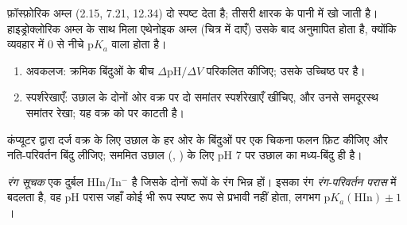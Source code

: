 फ़ॉस्फ़ोरिक अम्ल (2.15, 7.21, 12.34) दो स्पष्ट  देता है; तीसरी
क्षारक के पानी में खो जाती है। हाइड्रोक्लोरिक अम्ल के साथ मिला एथेनोइक अम्ल
(चित्र में दाएँ) उसके बाद अनुमापित होता है, क्योंकि  व्यवहार में 0 से नीचे $\mathrm{p}K_a$ वाला होता है।

\begin{method}[वक्र पर तुल्यता खोजना]\label{met:b1:titration-methods:derivative}
\begin{enumerate}
  \item अवकलज: क्रमिक बिंदुओं के बीच $\Delta\mathrm{pH}/\Delta V$ परिकलित
        कीजिए;  उसके उच्चिष्ठ पर है।
  \item स्पर्शरेखाएँ: उछाल के दोनों ओर वक्र पर दो समांतर स्पर्शरेखाएँ
        खींचिए, और उनसे समदूरस्थ समांतर रेखा; यह
        वक्र को  पर काटती है।
\end{enumerate}
\end{method}

\begin{method}[स्पर्शरेखाएँ, परिकलन द्वारा]\label{met:b1:titration-methods:tangents}
कंप्यूटर द्वारा दर्ज वक्र के लिए उछाल के हर ओर के बिंदुओं पर
एक चिकना फलन फ़िट कीजिए और नति-परिवर्तन बिंदु लीजिए; सममित
उछाल (, ) के लिए pH 7 पर उछाल का
मध्य-बिंदु ही  है।
\end{method}

\begin{definition}[रंग सूचक, रंग-परिवर्तन परास]\label{def:b1:titration-methods:indicator}
\emph{रंग सूचक} एक दुर्बल  HIn/In$^-$ है जिसके दोनों रूपों के रंग भिन्न हों। इसका रंग
\emph{रंग-परिवर्तन परास} में बदलता है, वह pH परास जहाँ
कोई भी रूप स्पष्ट रूप से प्रभावी नहीं होता, लगभग $\mathrm{p}K_{a}(\mathrm{HIn}) \pm 1$।
\end{definition}

